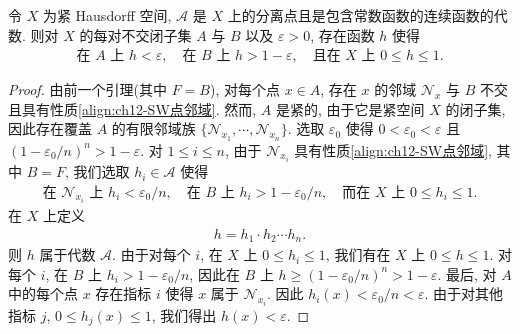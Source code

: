 \documentclass[../../main.tex]{subfiles}
\begin{document}
\begin{lemma}\label{lemma:ch12-SW分离}
令 $X$ 为紧 Hausdorff 空间, $\mathcal{A}$ 是 $X$ 上的分离点且是包含常数函数的连续函数的代数. 则对 $X$ 的每对不交闭子集 $A$ 与 $B$ 以及 $\varepsilon>0$, 存在函数 $h$ 使得
\begin{align}
\text{在 }A\text{ 上 }h<\varepsilon,\quad\text{在 }B\text{ 上 }h>1-\varepsilon,\quad\text{且在 }X\text{ 上 }0\leqslant h\leqslant 1.\label{align:ch12-SW分离}
\end{align}
\end{lemma}

\begin{proof}
由前一个引理(其中 $F=B$), 对每个点 $x\in A$, 存在 $x$ 的邻域 $\mathcal{N}_{x}$ 与 $B$ 不交且具有性质\eqref{align:ch12-SW点邻域}. 然而, $A$ 是紧的, 由于它是紧空间 $X$ 的闭子集, 因此存在覆盖 $A$ 的有限邻域族 $\{\mathcal{N}_{x_{1}},\cdots,\mathcal{N}_{x_{n}}\}$. 选取 $\varepsilon_{0}$ 使得 $0<\varepsilon_{0}<\varepsilon$ 且 $(1-\varepsilon_{0}/n)^{n}>1-\varepsilon$. 对 $1\leqslant i\leqslant n$, 由于 $\mathcal{N}_{x_{i}}$ 具有性质\eqref{align:ch12-SW点邻域}, 其中 $B=F$, 我们选取 $h_{i}\in\mathcal{A}$ 使得
\begin{align*}
\text{在 }\mathcal{N}_{x_{i}}\text{ 上 }h_{i}<\varepsilon_{0}/n,\quad\text{在 }B\text{ 上 }h_{i}>1-\varepsilon_{0}/n,\quad\text{而在 }X\text{ 上 }0\leqslant h_{i}\leqslant 1.
\end{align*}
在 $X$ 上定义
\begin{align*}
h=h_{1}\cdot h_{2}\cdots h_{n}.
\end{align*}
则 $h$ 属于代数 $\mathcal{A}$. 由于对每个 $i$, 在 $X$ 上 $0\leqslant h_{i}\leqslant 1$, 我们有在 $X$ 上 $0\leqslant h\leqslant 1$. 对每个 $i$, 在 $B$ 上 $h_{i}>1-\varepsilon_{0}/n$, 因此在 $B$ 上 $h\geqslant(1-\varepsilon_{0}/n)^{n}>1-\varepsilon$. 最后, 对 $A$ 中的每个点 $x$ 存在指标 $i$ 使得 $x$ 属于 $\mathcal{N}_{x_{i}}$. 因此 $h_{i}(x)<\varepsilon_{0}/n<\varepsilon$. 由于对其他指标 $j$, $0\leqslant h_{j}(x)\leqslant 1$, 我们得出 $h(x)<\varepsilon$.
\end{proof}
\end{document}
